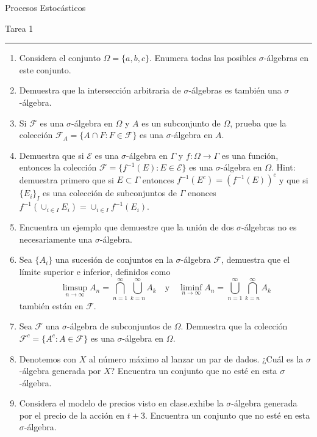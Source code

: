 \documentclass{report}
\begin{document}
\begin{center}
    \textsf{\Large Procesos Estocásticos}
    \par\medskip
    \textsf{\large Tarea 1}
\end{center}
\hrule
\par\bigskip

\begin{enumerate}
    \item Considera el conjunto $\Omega = \{a, b, c\}$. Enumera todas las posibles $\sigma$-álgebras en este conjunto.
    \item Demuestra que la intersección arbitraria de $\sigma$-álgebras es también una $\sigma$-álgebra.
    \item Si $\mathcal{F}$ es una $\sigma$-álgebra en $\Omega$ y $A$ es un subconjunto de $\Omega$, prueba que la colección $\mathcal{F}_A = \{A \cap F : F \in \mathcal{F}\}$ es una $\sigma$-álgebra en $A$.
    \item Demuestra que si $\mathcal{E}$ es una $\sigma$-álgebra en $\Gamma$ y $f: \Omega \rightarrow \Gamma$ es una función, entonces la colección $\mathcal{F} = \{ f^{-1}(E) : E \in \mathcal{E} \}$ es una $\sigma$-álgebra en $\Omega$. Hint: demuestra primero que si $E\subset \Gamma$ entonces $f^{-1}(E^c) = (f^{-1}(E))^c$ y que si $\{E_i\}_{I}$ es una colección de subconjuntos de $\Gamma$ enonces  $f^{-1}(\cup_{i\in I} E_i) = \cup_{i\in I} f^{-1}(E_i)$.
    \item Encuentra un ejemplo que demuestre que la unión de dos $\sigma$-álgebras no es necesariamente una $\sigma$-álgebra.
    \item Sea $\{A_i\}$ una sucesión de conjuntos en la $\sigma$-álgebra $\mathcal{F}$, demuestra que el límite superior e inferior, definidos como 
    $$
        \limsup_{n\rightarrow \infty}A_n = \bigcap_{n=1}^\infty\bigcup_{k=n}^\infty A_k \quad\text{y}\quad \liminf_{n\rightarrow \infty} A_n =      \bigcup_{n=1}^{\infty}\bigcap_{k=n}^\infty A_k
    $$
    también están en $\mathcal{F}$.
    \item Sea $\mathcal{F}$ una $\sigma$-álgebra de subconjuntos de $\Omega$. Demuestra que la colección $\mathcal{F}^c = \{A^c : A \in \mathcal{F}\}$ es una $\sigma$-álgebra en $\Omega$.
    \item Denotemos con $X$ al número máximo al lanzar un par de dados. ¿Cuál es la $\sigma$-álgebra generada por $X$? Encuentra un conjunto que no esté en esta $\sigma$-álgebra.
    \item Considera el modelo de precios visto en clase.exhibe la $\sigma$-álgebra generada por el precio de la acción en $t+3$. Encuentra un conjunto que no esté en esta $\sigma$-álgebra.

\end{enumerate}
\end{document}
